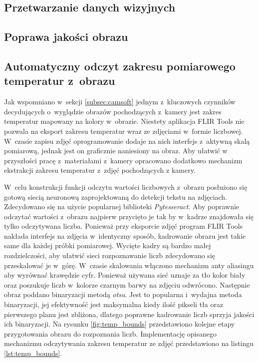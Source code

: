 \subsection{Przetwarzanie danych wizyjnych}

\subsection{Poprawa jakości obrazu}

\subsection{Automatyczny odczyt zakresu pomiarowego temperatur z~obrazu}
Jak wspomniano w~sekcji \ref{subsec:camsoft} jednym z~kluczowych czynników
decydujących o~wyglądzie obrazów pochodzących z~kamery jest zakres temperatur
mapowany na kolory w~obrazie.
Niestety aplikacja FLIR Tools nie pozwala na eksport zakresu temperatur wraz
ze zdjęciami w~formie liczbowej.
W~czasie zapisu zdjęć oprogramowanie dodaje na nich interfejs z~aktywną skalą
pomiarową, jednak jest on graficznie naniesiony na obraz.
Aby ułatwić w przyszłości pracę z~materiałami z~kamery opracowano dodatkowo
mechanizm ekstrakcji zakresu temperatur z~zdjęć pochodzących z kamery.

W~celu konstrukcji funkcji odczytu wartości liczbowych z~obrazu posłużono
się gotową siecią neuronową zaprojektowaną do detekcji tekstu na zdjęciach.
Zdecydowano się na użycie popularnej biblioteki \emph{Pytesseract}.
Aby poprawnie odczytać wartości z~obrazu najpierw przycięto je tak by w~kadrze
znajdowała się tylko odczytywana liczba.
Ponieważ przy eksporcie zdjęć program FLIR Tools nakłada interfejs na zdjęcia
w~identyczny sposób, kadrowanie obrazu jest takie same dla każdej próbki
pomiarowej.
Wycięte kadry są bardzo małej rozdzielczości, aby ułatwić sieci rozpoznawanie
liczb zdecydowano się przeskalować je w~górę.
W~czasie skalowania włączono mechanizm anty aliasingu aby wyrównać krawędzie
cyfr.
Ponieważ używana sieć uznaje za tło kolor biały oraz poszukuje liczb w~kolorze
czarnym barwy na zdjęciu odwrócono.
Następnie obraz poddano binaryzacji metodą \emph{otsu}.
Jest to popularna i~wydajna metoda binaryzacji, jej efektywność jest
maksymalna kiedy ilość pikseli tła oraz pierwszego planu jest zbliżona,
dlatego poprawne kadrowanie liczb sprzyja jakości ich binaryzacji\cite{sezgin}.
Na rysunku \ref{fig:temp_bounds} przedstawiono kolejne etapy przygotowania
obrazu do rozpoznania liczb.
Implementację opisanego mechanizmu odczytywania zakresu temperatur ze zdjęć
przedstawiono na listingu \ref{lst:temp_bounds}.

